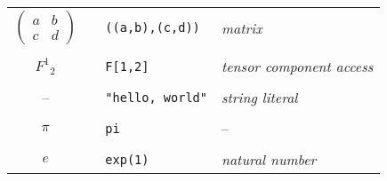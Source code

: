 \begin{center}
\begin{tabular}{clll}
$\begin{pmatrix}a&b\\ c&d\end{pmatrix}$ & & {\tt ((a,b),(c,d))} & {\it matrix} \\
\\
$F^1{}_2$ & & {\tt F[1,2]} & {\it tensor component access} \\
\\
-- & & \verb$"hello, world"$ & {\it string literal} \\
\\
$\pi$ & & {\tt pi} & -- \\
\\
$e$ && {\tt exp(1)} & {\it natural number}
\end{tabular}
\end{center}
